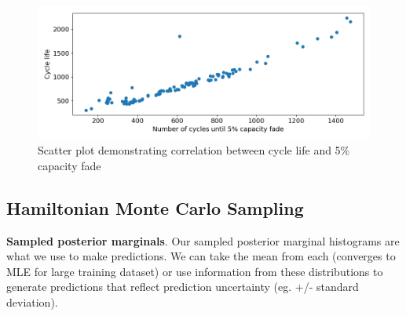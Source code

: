 \documentclass{article}
\begin{document}
    \begin{figure}[H]
        \centering
        \includegraphics[scale=0.5] {figs/correlation_cycle_life_vs_5pct_fade.png}
        \caption{Scatter plot demonstrating correlation between cycle life and 5\% capacity fade}
        \label{fig:1e}
    \end{figure}

\newpage
\subsection{Hamiltonian Monte Carlo Sampling}

\textbf{Sampled posterior marginals}. Our sampled posterior marginal histograms are what we use to make predictions. We can take the mean from each (converges to MLE for large training dataset) or use information from these distributions to generate predictions that reflect prediction uncertainty (eg. +/- standard deviation). 
\end{document}
